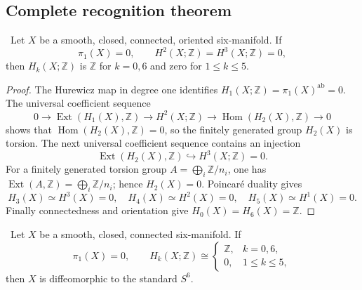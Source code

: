 \subsection{Complete recognition theorem}

\begin{lemma}
\label{mapsI:top:lem:cohomological-closure}
\ Let $X$ be a smooth, closed, connected, oriented six-manifold.
If
\[
\pi_1(X)=0,
\qquad H^2(X;\mathbb Z)=H^3(X;\mathbb Z)=0,
\tag{TM.4.4}
\]
then $H_k(X;\mathbb Z)$ is $\mathbb Z$ for $k=0,6$ and zero for
$1\le k\le5$.
\end{lemma}

\begin{proof}
The Hurewicz map in degree one identifies
$H_1(X;\mathbb Z)=\pi_1(X)^{\mathrm{ab}}=0$.  The universal coefficient
sequence
\[
0\longrightarrow\operatorname{Ext}(H_1(X),\mathbb Z)
\longrightarrow H^2(X;\mathbb Z)
\longrightarrow\operatorname{Hom}(H_2(X),\mathbb Z)
\longrightarrow0
\]
shows that $\operatorname{Hom}(H_2(X),\mathbb Z)=0$, so the finitely
generated group $H_2(X)$ is torsion.  The next universal coefficient
sequence contains an injection
\[
\operatorname{Ext}(H_2(X),\mathbb Z)
\hookrightarrow H^3(X;\mathbb Z)=0.
\]
For a finitely generated torsion group
$A=\bigoplus_i\mathbb Z/n_i$, one has
$\operatorname{Ext}(A,\mathbb Z)=\bigoplus_i\mathbb Z/n_i$; hence
$H_2(X)=0$.  Poincar\'e duality gives
\[
H_3(X)\simeq H^3(X)=0,\quad
H_4(X)\simeq H^2(X)=0,\quad
H_5(X)\simeq H^1(X)=0.
\]
Finally connectedness and orientation give $H_0(X)=H_6(X)=\mathbb Z$.
\end{proof}

\begin{theorem}
\label{mapsI:top:thm:sphere-recognition}
\ Let $X$ be a smooth, closed, connected six-manifold.  If
\[
\pi_1(X)=0,\qquad
H_k(X;\mathbb Z)\cong
\begin{cases}
\mathbb Z,&k=0,6,\\
0,&1\le k\le5,
\end{cases}
\tag{TM.4.5}
\]
then $X$ is diffeomorphic to the standard $S^6$.
\end{theorem}


